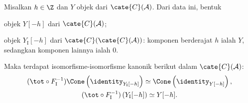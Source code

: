\begin{lema}\label{prop:double-cplx-tot-aux0}
	Misalkan $h \in \Z$ dan $Y$ objek dari $\cate{C}(\mathcal{A})$. Dari data
	ini, bentuk
	\begin{compactitem}
		\item objek $Y[-h]$ dari $\cate{C}(\mathcal{A})$;
		\item objek $Y_{\mathrm{I}}[-h]$ dari
		$\cate{C}(\cate{C}(\mathcal{A}))$: komponen berderajat $h$ ialah $Y$,
		sedangkan komponen lainnya ialah $0$.
	\end{compactitem}
	Maka terdapat isomorfisme-isomorfisme kanonik berikut dalam
	$\cate{C}(\mathcal{A})$:
	\begin{gather*}
		(\tot \circ F_{\mathrm{I}}^{-1}) \Cone\left( \identity_{Y_{\mathrm{I}}[-h]} \right) \simeq \Cone\left( \identity_{Y[-h]} \right), \\
		(\tot \circ F_{\mathrm{I}}^{-1}) \left( Y_{\mathrm{I}}[-h] \right) \simeq Y[-h].
	\end{gather*}
\end{lema}
